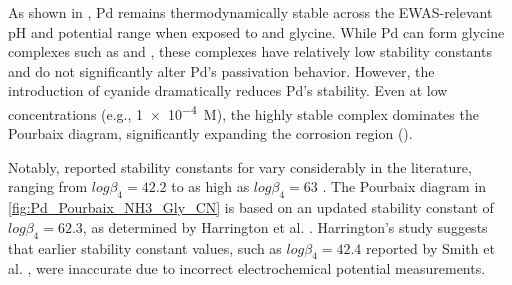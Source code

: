 \documentclass[journal=jacsat,manuscript=article]{achemso}
\begin{document}
As shown in , Pd remains thermodynamically stable across the EWAS-relevant pH and potential range when exposed to  and glycine. While Pd can form glycine complexes such as \ce{[Pd(Gly)^+]} and \ce{[Pd(Gly)_2]}, these complexes have relatively low stability constants and do not significantly alter Pd's passivation behavior. However, the introduction of cyanide dramatically reduces Pd’s stability. Even at low  concentrations (e.g., \num{1e-4}~M), the highly stable  complex dominates the Pourbaix diagram, significantly expanding the corrosion region ().

Notably, reported stability constants for  vary considerably in the literature, ranging from $log\beta_4 = 42.2$ \cite{Smith1989CriticalConstants} to as high as $log\beta_4 = 63$ \cite{Cabbiness1969MacrocyclicComplexes}. The Pourbaix diagram in \ref{fig:Pd_Pourbaix_NH3_Gly_CN} is based on an updated stability constant of $log\beta_4 = 62.3$, as determined by Harrington et al. \cite{Harrington2005DeterminationIon}. Harrington’s study suggests that earlier stability constant values, such as $log\beta_4 = 42.4$ reported by Smith et al. \cite{Smith1989CriticalConstants}, were inaccurate due to incorrect electrochemical potential measurements. 

\end{document}
